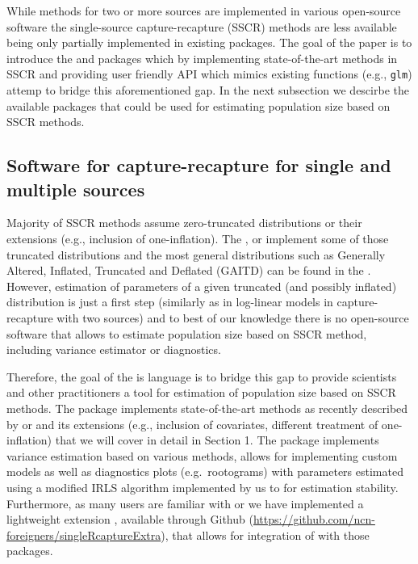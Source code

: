 \documentclass[
]{jss}
\newcommand{\1}{\mathcal{I}} \newcommand{\bZero}{\boldsymbol{0}}
\begin{document}
While methods for two or more sources are implemented in various
open-source software \citep[e.g.,][]{baillargeon2007rcapture} the
single-source capture-recapture (SSCR) methods are less available being
only partially implemented in existing  packages. The goal
of the paper is to introduce the  and
 packages which by implementing
state-of-the-art methods in SSCR and providing user friendly API which
mimics existing  functions (e.g., \texttt{glm}) attemp to
bridge this aforementioned gap. In the next subsection we descirbe the
available  packages that could be used for estimating
population size based on SSCR methods.

\subsection{Software for capture-recapture for single and multiple
sources}\label{sec-software}

Majority of SSCR methods assume zero-truncated distributions or their
extensions (e.g., inclusion of one-inflation). The 
\citep{countreg},  \citep{VGAM-main} or 
\citep{distributions3} implement some of those truncated distributions
and the most general distributions such as Generally Altered, Inflated,
Truncated and Deflated (GAITD) can be found in the . However,
estimation of parameters of a given truncated (and possibly inflated)
distribution is just a first step (similarly as in log-linear models in
capture-recapture with two sources) and to best of our knowledge there
is no open-source software that allows to estimate population size based
on SSCR method, including variance estimator or diagnostics.

Therefore, the goal of the  is  language
is to bridge this gap to provide scientists and other practitioners a
tool for estimation of population size based on SSCR methods. The
package implements state-of-the-art methods as recently described by
\citet{bohning2018capture} or \citet{bohning2024one} and its extensions
(e.g., inclusion of covariates, different treatment of one-inflation)
that we will cover in detail in Section 1. The package implements
variance estimation based on various methods, allows for implementing
custom models as well as diagnostics plots (e.g.~rootograms) with
parameters estimated using a modified IRLS algorithm implemented by us
to for estimation stability. Furthermore, as many  users are
familiar with  or  we have implemented a
lightweight extension , available through
Github (\url{https://github.com/ncn-foreigners/singleRcaptureExtra}),
that allows for integration of  with those packages.
\end{document}
